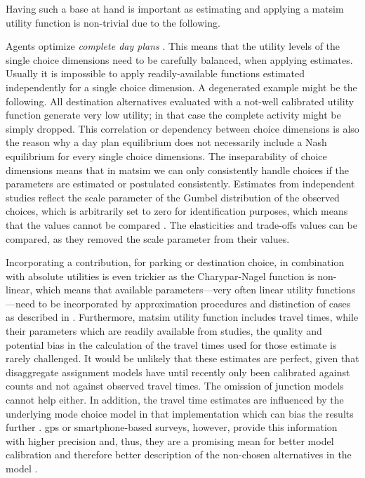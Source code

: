 Having such a base at hand is important as estimating and applying a \gls{matsim} utility function is non-trivial due to the following. 

%
Agents optimize \emph{complete day plans} \citep[see also][Section 6.3.1]{MATSim_Userguide_2015}. This means that the utility levels of the single choice dimensions need to be carefully balanced, when applying estimates. Usually it is impossible to apply readily-available functions estimated independently for a single choice dimension. A degenerated example might be the following. All destination alternatives evaluated with a not-well calibrated utility function generate very low utility; in that case the complete activity might be simply dropped. 
%
 
%
This correlation or dependency between choice dimensions is also the reason why a day plan equilibrium does not necessarily include a Nash equilibrium for every single choice dimensions. 
The inseparability of choice dimensions means that in \gls{matsim} we can only consistently handle choices if the parameters are estimated or postulated consistently. 
Estimates from independent studies reflect the scale parameter of the Gumbel distribution of the observed choices, which is arbitrarily set to zero for identification purposes, which means that the values cannot be compared 
. The elasticities and trade-offs values can be compared, as they removed the scale parameter from their values. 
%
 

Incorporating a contribution, \eg for parking or destination choice, in combination with absolute utilities is even trickier as the Charypar-Nagel function is non-linear, which means that available parameters---very often linear utility functions---need to be incorporated by approximation procedures and distinction of cases as described in \citet[][p.75ff]{Horni_PhDThesis_2013}. 
Furthermore, \gls{matsim} utility function includes travel times, while their parameters which are readily available from studies, the quality and potential bias in the calculation of the travel times used for those estimate is rarely challenged. 
It would be unlikely that these estimates are perfect, given that disaggregate assignment models have until recently only been calibrated against counts and not against observed travel times. 
The omission of junction models cannot help either. 
In addition, the travel time estimates are influenced by the underlying mode choice model in that implementation which can bias the results further \citep[][]{Vrtic_PhDThesis_2003}. 
\gls{gps} or smartphone-based surveys, however, provide this information with higher precision and, thus, they are a promising mean for better model calibration and therefore better description of the non-chosen alternatives in the model .

